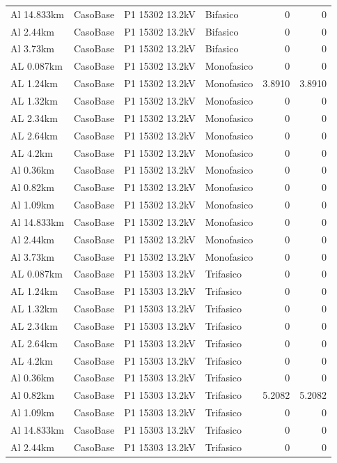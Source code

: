 \documentclass[11pt,a4paper]{article}
\begin{document}
\begin{longtable}{llllrr}
Al 14.833km & CasoBase & P1 15302 13.2kV & Bifasico & 0 & 0 \\
Al 2.44km & CasoBase & P1 15302 13.2kV & Bifasico & 0 & 0 \\
Al 3.73km & CasoBase & P1 15302 13.2kV & Bifasico & 0 & 0 \\
AL 0.087km & CasoBase & P1 15302 13.2kV & Monofasico & 0 & 0 \\
AL 1.24km & CasoBase & P1 15302 13.2kV & Monofasico & 3.8910 & 3.8910 \\
AL 1.32km & CasoBase & P1 15302 13.2kV & Monofasico & 0 & 0 \\
AL 2.34km & CasoBase & P1 15302 13.2kV & Monofasico & 0 & 0 \\
AL 2.64km & CasoBase & P1 15302 13.2kV & Monofasico & 0 & 0 \\
AL 4.2km & CasoBase & P1 15302 13.2kV & Monofasico & 0 & 0 \\
Al 0.36km & CasoBase & P1 15302 13.2kV & Monofasico & 0 & 0 \\
Al 0.82km & CasoBase & P1 15302 13.2kV & Monofasico & 0 & 0 \\
Al 1.09km & CasoBase & P1 15302 13.2kV & Monofasico & 0 & 0 \\
Al 14.833km & CasoBase & P1 15302 13.2kV & Monofasico & 0 & 0 \\
Al 2.44km & CasoBase & P1 15302 13.2kV & Monofasico & 0 & 0 \\
Al 3.73km & CasoBase & P1 15302 13.2kV & Monofasico & 0 & 0 \\
AL 0.087km & CasoBase & P1 15303 13.2kV & Trifasico & 0 & 0 \\
AL 1.24km & CasoBase & P1 15303 13.2kV & Trifasico & 0 & 0 \\
AL 1.32km & CasoBase & P1 15303 13.2kV & Trifasico & 0 & 0 \\
AL 2.34km & CasoBase & P1 15303 13.2kV & Trifasico & 0 & 0 \\
AL 2.64km & CasoBase & P1 15303 13.2kV & Trifasico & 0 & 0 \\
AL 4.2km & CasoBase & P1 15303 13.2kV & Trifasico & 0 & 0 \\
Al 0.36km & CasoBase & P1 15303 13.2kV & Trifasico & 0 & 0 \\
Al 0.82km & CasoBase & P1 15303 13.2kV & Trifasico & 5.2082 & 5.2082 \\
Al 1.09km & CasoBase & P1 15303 13.2kV & Trifasico & 0 & 0 \\
Al 14.833km & CasoBase & P1 15303 13.2kV & Trifasico & 0 & 0 \\
Al 2.44km & CasoBase & P1 15303 13.2kV & Trifasico & 0 & 0 \\

\end{longtable}
\end{document}
